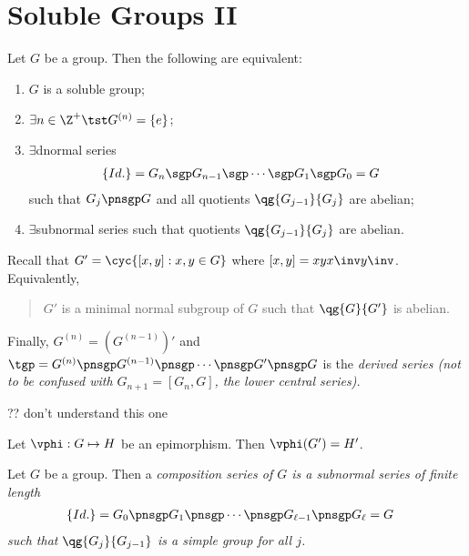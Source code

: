 \documentclass[a4paper]{article}
\begin{document}
\section{Soluble Groups II}
\begin{ttheorem}
  Let \( G \) be a group.
  Then the following are equivalent:
  \begin{enumerate}
    \item \( G \) is a soluble group;
    \item \( \exists n\in \Z^{+} \tst G^{(n)} = \left\{ e \right\} \);
    \item \( \exists \)dnormal series \begin{align*}
      \left\{ Id. \right\} &= G_n \sgp G_{n-1} \sgp \cdots \sgp G_1 \sgp G_0 = G
    \end{align*}
    such that \( G_j \pnsgp G \) and all quotients \( \qg{G_{j-1}}{G_j} \) are abelian;
    \item \( \exists \)subnormal series such that quotients \( \qg{G_{j-1}}{G_j} \) are abelian.
  \end{enumerate}
\end{ttheorem}

\begin{tremark}
  Recall that \( G' = \cyc{[x,y] : x,y\in G} \) where \( [x,y] = xyx\inv y\inv \).
  Equivalently,\begin{quote}
    \vspace{-1.9em}\begin{texercise}
      \( G' \) is a minimal normal subgroup of \( G \) such that \( \qg{G}{G'} \) is abelian.
    \end{texercise}
  \end{quote}
  Finally, \( G^{(n)} = \left( G^{(n-1)} \right)' \) and \( \tgp = G^{(n)} \pnsgp G^{(n-1)} \pnsgp \cdots \pnsgp G' \pnsgp G \) is the \it{derived series} (not to be confused with \( G_{n+1} = [G_n, G]\), the \it{lower central series}).
\end{tremark}

\begin{tremark}
?? don't understand this one
\end{tremark}

\begin{tlemma}
  Let \( \vphi:G\mapsto H \) be an epimorphism.
  Then \( \vphi(G') = H' \).
\end{tlemma}

\begin{tdefinition}
  Let \( G \) be a group.
  Then a \it{composition series} of \( G \) is a subnormal series of finite length
  \begin{align*}
    \left\{ Id. \right\} &= G_0 \pnsgp G_{1} \pnsgp \cdots \pnsgp G_{\ell-1} \pnsgp G_\ell = G
  \end{align*}
  such that \( \qg{G_j}{G_{j-1}} \) is a simple group for all \( j \).
\end{tdefinition}
\end{document}
